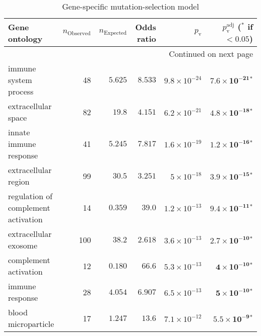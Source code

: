 \begin{longtable}{|l|r|r|r|r|r|}
    \caption{Gene-specific mutation-selection model} \\
    \toprule
    Gene ontology                                         & $n_{\mathrm{Observed}}$ & $n_{\mathrm{Expected}}$ & Odds ratio & $p_{\mathrm{v}}$ & $p_{\mathrm{v}}^{\mathrm{adj}}$ ($\bm{^*}$ if $ < 0.05$) \\
    \midrule
    \endhead
    \midrule
    \multicolumn{6}{r}{{Continued on next page}} \\
    \midrule
    \endfoot

    \bottomrule
    \endlastfoot
    immune system process                                 & 48                      & $ 5.625$                & $ 8.533$   & $9.8\times 10^{-24}$ & $\bm{7.6\times 10^{-21}{^*}}$   \\
    extracellular space                                   & 82                      & $  19.8$                  & $ 4.151$   & $6.2\times 10^{-21}$ & $\bm{4.8\times 10^{-18}{^*}}$   \\
    innate immune response                                & 41                      & $ 5.245$                & $ 7.817$   & $1.6\times 10^{-19}$ & $\bm{1.2\times 10^{-16}{^*}}$   \\
    extracellular region                                  & 99                      & $  30.5$                  & $ 3.251$   & $ 5\times 10^{-18}$  & $\bm{3.9\times 10^{-15}{^*}}$   \\
    regulation of complement activation                   & 14                      & $ 0.359$                & $  39.0$     & $1.2\times 10^{-13}$ & $\bm{9.4\times 10^{-11}{^*}}$   \\
    extracellular exosome                                 & 100                     & $  38.2$                  & $ 2.618$   & $3.6\times 10^{-13}$ & $\bm{2.7\times 10^{-10}{^*}}$   \\
    complement activation                                 & 12                      & $ 0.180$                & $  66.6$     & $5.3\times 10^{-13}$ & $\bm{ 4\times 10^{-10}{^*}}$    \\
    immune response                                       & 28                      & $ 4.054$                & $ 6.907$   & $6.5\times 10^{-13}$ & $\bm{ 5\times 10^{-10}{^*}}$    \\
    blood microparticle                                   & 17                      & $ 1.247$                & $  13.6$     & $7.1\times 10^{-12}$ & $\bm{5.5\times 10^{-9}{^*}}$    \\

\end{longtable}
